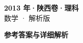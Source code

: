 \documentclass[zihao=-4, a4paper]{ctexart}
\begin{document}
\begin{center}
  {\Large\bfseries 2013 年·陕西卷·理科}\\[4pt]
  {\large 数学 · 解析版}
\end{center}
\medskip
{}

\clearpage
{}
\begin{center}{\Large\bfseries 参考答案与详细解析}\end{center}
\medskip

\end{document}
